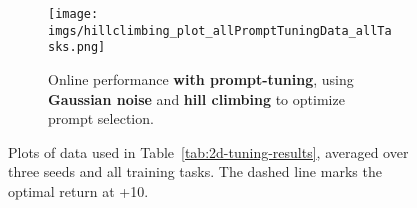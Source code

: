 \documentclass{article} %
\begin{document}
\begin{figure}[H]
\begin{subfigure}{\linewidth}
        \label{fig:ucb_rawSegments_onlineRollouts_2d}
    \end{subfigure}
    \begin{subfigure}{\linewidth}
        \centering
        \texttt{[image: imgs/hillclimbing\_plot\_allPromptTuningData\_allTasks.png]}
        \caption{Online performance \textbf{with prompt-tuning}, using \textbf{Gaussian noise} and \textbf{hill climbing} to optimize prompt selection.}
        \label{fig:hillclimbing_onlineRollouts_2d}
    \end{subfigure}
    \caption{Plots of data used in Table~\ref{tab:2d-tuning-results}, averaged over three seeds and all training tasks. The dashed line marks the optimal return at +10. }
    \label{fig:all_prompt_tuning_results}
\end{figure}
\clearpage


\end{document}
